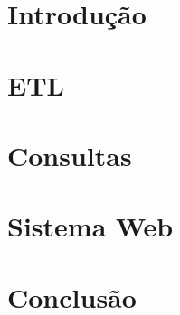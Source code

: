 \section{Introdução}

\section{ETL}

\section{Consultas}

\section{Sistema Web}

\section{Conclusão}